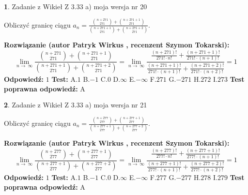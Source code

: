 \documentclass[12pt, a4paper]{article}
\theoremstyle{definition} %
\newtheorem{zad}{}
\newcommand{\zadStart}[1]{\begin{zad}#1\newline}
\newcommand{\zadStop}{\end{zad}}
\newcommand{\rozwStart}[2]{\noindent \textbf{Rozwiązanie (autor #1 , recenzent #2): }\newline}
\newcommand{\rozwStop}{\newline}
\newcommand{\odpStart}{\noindent \textbf{Odpowiedź:}\newline}
\newcommand{\odpStop}{\newline}
\newcommand{\testStart}{\noindent \textbf{Test:}\newline}
\newcommand{\testStop}{\newline}
\newcommand{\kluczStart}{\noindent \textbf{Test poprawna odpowiedź:}\newline}
\newcommand{\kluczStop}{\newline}
\begin{document}
\zadStart{Zadanie z Wikieł Z 3.33 a) moja wersja nr 20}

Obliczyć granicę ciągu $a_{n}=\frac{{n+271\choose271}+{n+271+1\choose271}}{{n+271+1\choose271}+{n+271+2\choose271}}$.
\zadStop
\rozwStart{Patryk Wirkus}{Szymon Tokarski}
$$\lim\limits_{n\to\ \infty}\frac{{n+271\choose271}+{n+271+1\choose271}}{{n+271+1\choose271}+{n+271+2\choose271}} = \lim\limits_{n\to\ \infty}\frac{\frac{(n+271)!}{271! \cdot n!}+\frac{(n+271+1)!}{271! \cdot (n+1)!}}{\frac{(n+271+1)!}{271! \cdot (n+1)!}+\frac{(n+271+2)!}{271! \cdot (n+2)!}} = 1$$
\rozwStop
\odpStart
$1$
\odpStop
\testStart
A.$1$ B.$-1$ C.$0$ D.$\infty$ E.$-\infty$
F.$271$ G.$-271$
H.$272$
I.$273$
\testStop
\kluczStart
A
\kluczStop



\zadStart{Zadanie z Wikieł Z 3.33 a) moja wersja nr 21}

Obliczyć granicę ciągu $a_{n}=\frac{{n+277\choose277}+{n+277+1\choose277}}{{n+277+1\choose277}+{n+277+2\choose277}}$.
\zadStop
\rozwStart{Patryk Wirkus}{Szymon Tokarski}
$$\lim\limits_{n\to\ \infty}\frac{{n+277\choose277}+{n+277+1\choose277}}{{n+277+1\choose277}+{n+277+2\choose277}} = \lim\limits_{n\to\ \infty}\frac{\frac{(n+277)!}{277! \cdot n!}+\frac{(n+277+1)!}{277! \cdot (n+1)!}}{\frac{(n+277+1)!}{277! \cdot (n+1)!}+\frac{(n+277+2)!}{277! \cdot (n+2)!}} = 1$$
\rozwStop
\odpStart
$1$
\odpStop
\testStart
A.$1$ B.$-1$ C.$0$ D.$\infty$ E.$-\infty$
F.$277$ G.$-277$
H.$278$
I.$279$
\testStop
\kluczStart
A
\kluczStop
\end{document}
